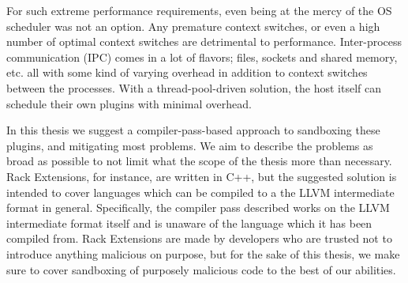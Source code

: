For such extreme performance requirements, even being at the mercy of the OS
scheduler was not an option. Any premature context switches, or even a high 
number of optimal context switches are detrimental to performance. Inter-process
communication (IPC) comes in a lot of flavors; files, sockets and shared memory,
etc. all with some kind of varying overhead in addition to context switches
between the processes. With a thread-pool-driven solution, the host itself can
schedule their own plugins with minimal overhead.

In this thesis we suggest a compiler-pass-based approach to sandboxing these
plugins, and mitigating most problems. We aim to describe the problems as broad
as possible to not limit what the scope of the thesis more than necessary. Rack
Extensions, for instance, are written in C++, but the suggested solution is
intended to cover languages which can be compiled to a the LLVM intermediate
format in general. Specifically, the compiler pass described works on the LLVM
intermediate format itself and is unaware of the language which it has been 
compiled from. Rack Extensions are made by developers who are trusted not to
introduce anything malicious on purpose, but for the sake of this thesis, we
make sure to cover sandboxing of purposely malicious code to the best of our
abilities.
